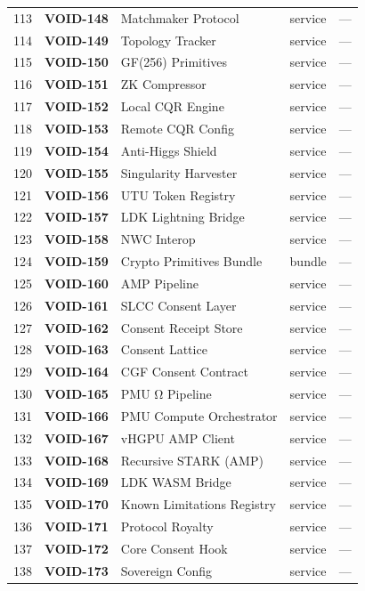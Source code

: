 \documentclass[10pt,a4paper,landscape]{article}
\begin{document}
\begin{longtable}{@{}rl p{4.2cm} p{1.4cm} p{3.8cm}@{}}
113 & \textbf{VOID-148} & Matchmaker Protocol & service & — \\
114 & \textbf{VOID-149} & Topology Tracker & service & — \\
115 & \textbf{VOID-150} & GF(256) Primitives & service & — \\
116 & \textbf{VOID-151} & ZK Compressor & service & — \\
117 & \textbf{VOID-152} & Local CQR Engine & service & — \\
118 & \textbf{VOID-153} & Remote CQR Config & service & — \\
119 & \textbf{VOID-154} & Anti-Higgs Shield & service & — \\
120 & \textbf{VOID-155} & Singularity Harvester & service & — \\
121 & \textbf{VOID-156} & UTU Token Registry & service & — \\
122 & \textbf{VOID-157} & LDK Lightning Bridge & service & — \\
123 & \textbf{VOID-158} & NWC Interop & service & — \\
124 & \textbf{VOID-159} & Crypto Primitives Bundle & bundle & — \\
125 & \textbf{VOID-160} & AMP Pipeline & service & — \\
126 & \textbf{VOID-161} & SLCC Consent Layer & service & — \\
127 & \textbf{VOID-162} & Consent Receipt Store & service & — \\
128 & \textbf{VOID-163} & Consent Lattice & service & — \\
129 & \textbf{VOID-164} & CGF Consent Contract & service & — \\
130 & \textbf{VOID-165} & PMU Ω Pipeline & service & — \\
131 & \textbf{VOID-166} & PMU Compute Orchestrator & service & — \\
132 & \textbf{VOID-167} & vHGPU AMP Client & service & — \\
133 & \textbf{VOID-168} & Recursive STARK (AMP) & service & — \\
134 & \textbf{VOID-169} & LDK WASM Bridge & service & — \\
135 & \textbf{VOID-170} & Known Limitations Registry & service & — \\
136 & \textbf{VOID-171} & Protocol Royalty & service & — \\
137 & \textbf{VOID-172} & Core Consent Hook & service & — \\
138 & \textbf{VOID-173} & Sovereign Config & service & — \\

\end{longtable}
\end{document}
